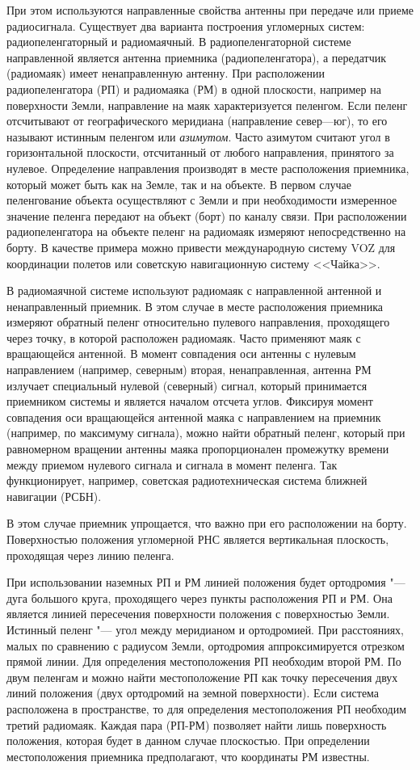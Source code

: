\documentclass[../main.tex]{subfiles}
\begin{document}
При этом используются направленные свойства антенны при передаче или приеме радиосигнала. Существует два варианта построения угломерных систем: радиопеленгаторный и радиомаячный. В радиопеленгаторной системе направленной является антенна приемника (радиопеленгатора), а передатчик (радиомаяк) имеет ненаправленную антенну. При расположении радиопеленгатора (РП) и радиомаяка (РМ) в одной плоскости, например на поверхности Земли, направление на маяк характеризуется пеленгом. Если пеленг отсчитывают от географического меридиана (направление север—юг), то его называют истинным пеленгом или \textit{азимутом}. Часто азимутом считают угол в горизонтальной плоскости, отсчитанный от любого направления, принятого за нулевое. Определение направления производят в месте расположения приемника, который может быть как на Земле, так и на объекте. В первом случае пеленгование объекта осуществляют с Земли и при необходимости измеренное значение пеленга передают на объект (борт) по каналу связи. При расположении радиопеленгатора на объекте пеленг на радиомаяк измеряют непосредственно на борту. В качестве примера можно привести международную систему VOZ для координации полетов или советскую навигационную систему <<Чайка>>.

В радиомаячной системе используют радиомаяк с направленной антенной и ненаправленный приемник. В этом случае в месте расположения приемника измеряют обратный пеленг относительно пулевого направления, проходящего через точку, в которой расположен радиомаяк. Часто применяют маяк с вращающейся антенной. В момент совпадения оси антенны с нулевым направлением (например, северным) вторая, ненаправленная, антенна РМ излучает специальный нулевой (северный) сигнал, который принимается приемником системы и является началом отсчета углов. Фиксируя момент совпадения оси вращающейся антенной маяка с направлением на приемник (например, по максимуму сигнала), можно найти обратный пеленг, который при равномерном вращении антенны маяка пропорционален промежутку времени между приемом нулевого сигнала и сигнала в момент пеленга. Так функционирует, например, советская радиотехническая система ближней навигации (РСБН).

В этом случае приемник упрощается, что важно при его расположении на борту. Поверхностью положения угломерной РНС является вертикальная плоскость, проходящая через линию пеленга.

При использовании наземных РП и РМ линией положения будет ортодромия "--- дуга большого круга, проходящего через пункты расположения РП и РМ. Она является линией пересечения поверхности положения с поверхностью Земли. Истинный пеленг "--- угол между меридианом и ортодромией. При расстояниях, малых по сравнению с радиусом Земли, ортодромия аппроксимируется отрезком прямой линии. Для определения местоположения РП необходим второй РМ. По двум пеленгам и можно найти местоположение РП как точку пересечения двух линий положения (двух ортодромий на земной поверхности). Если система расположена в пространстве, то для определения местоположения РП необходим третий радиомаяк. Каждая пара (РП-РМ) позволяет найти лишь поверхность положения, которая будет в данном случае плоскостью. При определении местоположения приемника предполагают, что координаты РМ известны.
\end{document}

